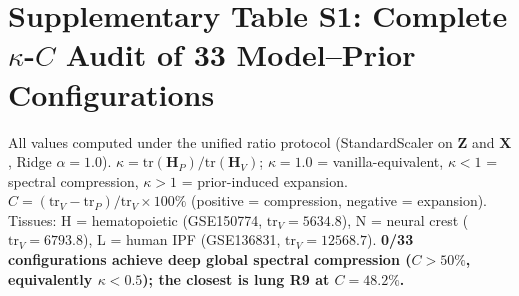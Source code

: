 \documentclass[11pt,a4paper]{article}
\newcommand{\Zmat}{\mathbf{Z}}\newcommand{\Xmat}{\mathbf{X}}\newcommand{\Hmat}{\mathbf{H}}
\begin{document}
\section*{Supplementary Table S1: Complete $\kappa$-$C$ Audit of 33 Model--Prior Configurations}
\label{tab:s1_audit}

All values computed under the unified ratio protocol (StandardScaler on $\Zmat$ and $\Xmat$, Ridge $\alpha=1.0$).
$\kappa = \mathrm{tr}(\mathbf{H}_P) / \mathrm{tr}(\mathbf{H}_V)$; $\kappa=1.0$ = vanilla-equivalent, $\kappa<1$ = spectral compression, $\kappa>1$ = prior-induced expansion.
$C = (\mathrm{tr}_V - \mathrm{tr}_P) / \mathrm{tr}_V \times 100\%$ (positive = compression, negative = expansion).
Tissues: H = hematopoietic (GSE150774, $\mathrm{tr}_V=5634.8$), N = neural crest ($\mathrm{tr}_V=6793.8$), L = human IPF (GSE136831, $\mathrm{tr}_V=12568.7$).
\textbf{0/33 configurations achieve deep global spectral compression ($C>50\%$, equivalently $\kappa<0.5$); the closest is lung R9 at $C=48.2\%$.}
\end{document}
